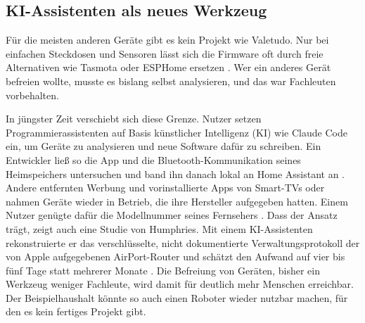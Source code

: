 \subsection{KI-Assistenten als neues Werkzeug}\label{sec:lokal-ki}

Für die meisten anderen Geräte gibt es kein Projekt wie Valetudo. Nur bei
einfachen Steckdosen und Sensoren lässt sich die Firmware oft durch freie
Alternativen wie Tasmota oder ESPHome ersetzen \cite{tasmota:oj,esphome:oj}.
Wer ein anderes Gerät befreien wollte, musste es bislang selbst analysieren,
und das war Fachleuten vorbehalten.

In jüngster Zeit verschiebt sich diese Grenze. Nutzer setzen
Programmierassistenten auf Basis künstlicher Intelligenz (\acrshort{KI}) wie
Claude Code ein, um Geräte zu analysieren und neue Software dafür zu schreiben.
Ein Entwickler ließ so die App und die Bluetooth-Kommunikation seines
Heimspeichers untersuchen und band ihn danach lokal an Home Assistant an
\cite{singh:2026}. Andere entfernten Werbung und vorinstallierte Apps von
Smart-TVs oder nahmen Geräte wieder in Betrieb, die ihre Hersteller aufgegeben
hatten. Einem Nutzer genügte dafür die Modellnummer seines Fernsehers
\cite{koebler:2026}. Dass der Ansatz trägt, zeigt auch eine Studie von
Humphries. Mit einem \acrshort{KI}-Assistenten rekonstruierte er das
verschlüsselte, nicht dokumentierte Verwaltungsprotokoll der von Apple
aufgegebenen AirPort-Router und schätzt den Aufwand auf vier bis fünf Tage
statt mehrerer Monate \cite[S.~1]{humphries:2026}. Die Befreiung von Geräten, bisher ein Werkzeug weniger
Fachleute, wird damit für deutlich mehr Menschen erreichbar. Der
Beispielhaushalt könnte so auch einen Roboter wieder nutzbar machen, für den
es kein fertiges Projekt gibt.

